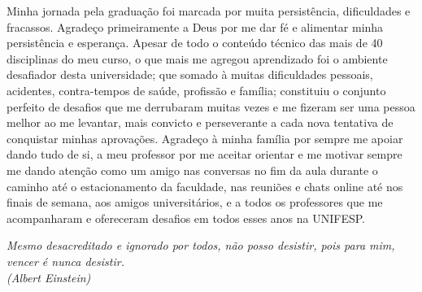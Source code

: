 \documentclass[	12pt, Times, openright, twoside, a4paper, english, brazil]{abntex2}
\begin{document}
    \begin{agradecimentos}
    Minha jornada pela graduação foi marcada por muita persistência, dificuldades e fracassos. Agradeço primeiramente a Deus por me dar fé e alimentar minha persistência e esperança. Apesar de todo o conteúdo técnico das mais de 40 disciplinas do meu curso, o que mais me agregou aprendizado foi o ambiente desafiador desta universidade; que somado à muitas dificuldades pessoais, acidentes, contra-tempos de saúde, profissão e família; constituiu o conjunto perfeito de desafios que me derrubaram muitas vezes e me fizeram ser uma pessoa melhor ao me levantar, mais convicto e perseverante a cada nova tentativa de conquistar minhas aprovações. Agradeço à minha família por sempre me apoiar dando tudo de si, a meu professor por me aceitar orientar e me motivar sempre me dando atenção como um amigo nas conversas no fim da aula durante o caminho até o estacionamento da faculdade, nas reuniões e chats online até nos finais de semana, aos amigos universitários, e a todos os professores que me acompanharam e ofereceram desafios em todos esses anos na UNIFESP. 

    \end{agradecimentos}

    \begin{epigrafe}
        \vspace*{\fill}
    	\begin{flushright}
    		\textit{Mesmo desacreditado e ignorado por todos, não posso desistir, pois para mim, vencer é nunca desistir.\\
    		(Albert Einstein)}
    	\end{flushright}
    \end{epigrafe}

\end{document}
